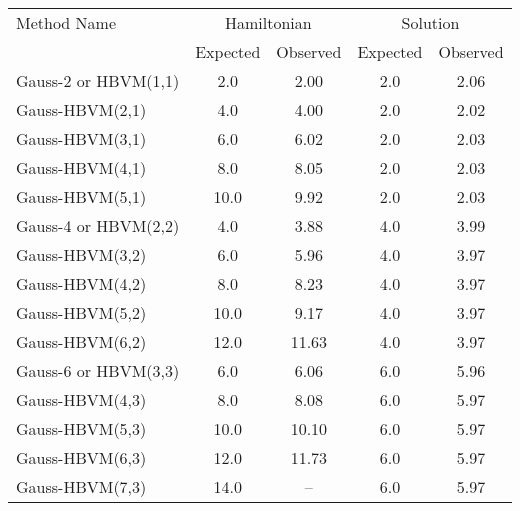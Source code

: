 \begin{tabular}{l|cccc}
\toprule
         Method Name & \multicolumn{2}{c}{Hamiltonian} & \multicolumn{2}{c}{Solution} \\
                     &    Expected & Observed & Expected & Observed \\
\midrule
Gauss-2 or HBVM(1,1) &         2.0 &     2.00 &      2.0 &     2.06 \\
     Gauss-HBVM(2,1) &         4.0 &     4.00 &      2.0 &     2.02 \\
     Gauss-HBVM(3,1) &         6.0 &     6.02 &      2.0 &     2.03 \\
     Gauss-HBVM(4,1) &         8.0 &     8.05 &      2.0 &     2.03 \\
     Gauss-HBVM(5,1) &        10.0 &     9.92 &      2.0 &     2.03 \\
Gauss-4 or HBVM(2,2) &         4.0 &     3.88 &      4.0 &     3.99 \\
     Gauss-HBVM(3,2) &         6.0 &     5.96 &      4.0 &     3.97 \\
     Gauss-HBVM(4,2) &         8.0 &     8.23 &      4.0 &     3.97 \\
     Gauss-HBVM(5,2) &        10.0 &     9.17 &      4.0 &     3.97 \\
     Gauss-HBVM(6,2) &        12.0 &    11.63 &      4.0 &     3.97 \\
Gauss-6 or HBVM(3,3) &         6.0 &     6.06 &      6.0 &     5.96 \\
     Gauss-HBVM(4,3) &         8.0 &     8.08 &      6.0 &     5.97 \\
     Gauss-HBVM(5,3) &        10.0 &    10.10 &      6.0 &     5.97 \\
     Gauss-HBVM(6,3) &        12.0 &    11.73 &      6.0 &     5.97 \\
     Gauss-HBVM(7,3) &        14.0 &       -- &      6.0 &     5.97 \\
\bottomrule
\end{tabular}
